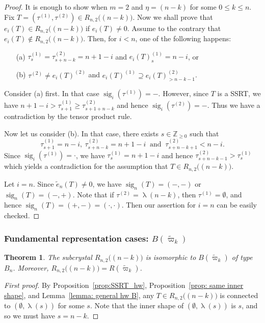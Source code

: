 \documentclass[11pt, leqno]{amsart}
\theoremstyle{plain}
\newtheorem{theorem}{Theorem}[section]
\theoremstyle{definition}
\numberwithin{equation}{section}
\newcommand{\fw}{\varpi} %
\newcommand{\tfw}{\widetilde{\fw}} %
\newcommand{\Z}{\mathbb{Z}}
\newcommand{\sig}{\operatorname{sig}} %
\begin{document}
\begin{proof}
It is enough to show when $m=2$ and $\eta = (n-k)$ for some $0 \le k \le n$. Fix $T = (\tau^{(1)},\tau^{(2)}) \in R_{n,2}\bigl((n-k)\bigr)$. Now we shall prove that
$e_i(T) \in R_{n,2}\bigl((n-k)\bigr)$ if $e_i(T) \ne 0$. Assume to the contrary that
$e_i(T) \not \in R_{n,2}\bigl((n-k)\bigr)$. Then, for $i<n$, one of the following happens:
\begin{itemize}
\item[{\rm (a)}] $\tau^{(1)}_s=\tau^{(2)}_{s+n-k}=n+1-i$ and $e_i(T)^{(1)}_s = n-i$, or
\item[{\rm (b)}] $\tau^{(2)} \ne e_i(T)^{(2)}$ and $e_i(T)^{(1)} \supseteq e_i(T)^{(2)}_{>n-k-1}$.
\end{itemize}
Consider {\rm (a)} first. In that case $\sig_i(\tau^{(1)})=-$. However, since $T$ is a SSRT, we have $n+1-i > \tau^{(1)}_{s+1} \ge \tau^{(2)}_{s+1+n-k}$ and hence $\sig_i(\tau^{(2)})=-$.
Thus we have a contradiction by the tensor product rule.

Now let us consider {\rm (b)}. In that case, there exists $s \in \Z_{\ge 0}$ such that
\[
\tau^{(1)}_{s+1}=n-i, \ \tau^{(2)}_{s+n-k}=n+1-i \ \text{ and } \ \tau^{(2)}_{s+n-k+1} < n-i.
\]
Since $\sig_i(\tau^{(1)})= \cdot$, we have $\tau^{(1)}_{s}=n+1-i$ and hence $\tau^{(2)}_{s+n-k-1} > \tau^{(1)}_{s}$ which yields a contradiction for the assumption that $T \in R_{n,2}\bigl((n-k)\bigr)$.

Let $i=n$.
Since $\tilde{e}_n(T) \ne 0$, we have $\sig_n(T)=(-,-)$ or  $\sig_n(T)=(-,+)$. Note that if $\tau^{(2)} = \uplambda(n-k)$, then $\tau^{(1)} = \emptyset$, and hence $\sig_n(T) = (+,-) = (\cdot,\cdot)$.
Then our assertion for $i=n$ can be easily checked.
\end{proof}

\subsubsection{Fundamental representation cases: $B(\tfw_k)$}

\begin{theorem} \label{thm: main fw}
The subcrystal $R_{n,2}\bigl( (n-k) \bigr)$ is isomorphic to $B(\tfw_k)$ of type $B_n$. Moreover, $R_{n,2}\bigl( (n-k) \bigr) = R(\tfw_k)$.
\end{theorem}

\begin{proof}[First proof]
By Proposition~\ref{prop:SSRT_hw}, Proposition~\ref{prop: same inner shape}, and Lemma~\ref{lemma: general hw B}, any $T \in R_{n,2}\bigl( (n-k) \bigr)$ is connected to $(\emptyset,\uplambda(s))$ for some $s$. Note that the inner shape of $(\emptyset,\uplambda(s))$ is $s$, and so we must have $s = n-k$.
\end{proof}
\end{document}

